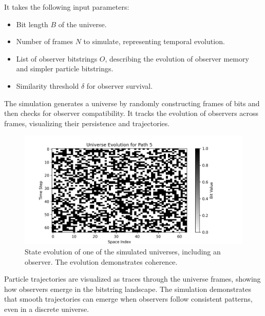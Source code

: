 \documentclass[12pt]{article}
\begin{document}
It takes the following input parameters:

\begin{itemize}
    \item Bit length $B$ of the universe.
    \item Number of frames $N$ to simulate, representing temporal evolution.
    \item List of observer bitstrings $O$, describing the evolution of observer memory and simpler particle bitstrings.
    \item Similarity threshold $\delta$ for observer survival.
\end{itemize}

The simulation generates a universe by randomly constructing frames of bits and then checks for observer compatibility. It tracks the evolution of observers across frames, visualizing their persistence and trajectories.

\begin{figure}[h!]
    \centering
    \includegraphics[width=1.0\textwidth]{figures/state_evolution_heatmap.png}
    \caption{State evolution of one of the simulated universes, including an observer. The evolution demonstrates coherence.}
    \label{fig:state_evolution}
\end{figure}

Particle trajectories are visualized as traces through the universe frames, showing how observers emerge in the bitstring landscape. The simulation demonstrates that smooth trajectories can emerge when observers follow consistent patterns, even in a discrete universe.
\end{document}
